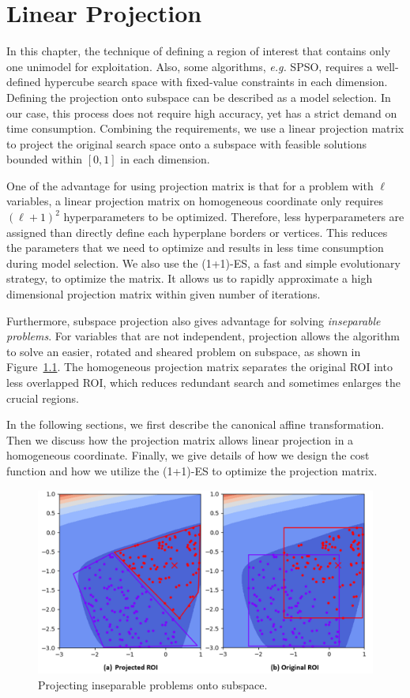 \chapter{Linear Projection}
\label{chapter:projection} 

In this chapter, the technique of defining a region of interest that contains only one unimodel for exploitation.
Also, some algorithms, \textit{e.g.} SPSO, requires a well-defined hypercube search space with fixed-value constraints in each dimension.
Defining the projection onto subspace can be described as a model selection.
In our case, this process does not require high accuracy, yet has a strict demand on time consumption.
Combining the requirements, we use a linear projection matrix to project the original search space 
onto a subspace with feasible solutions bounded within $[0,1]$ in each dimension.

One of the advantage for using projection matrix is that for a problem with $\ell$ variables, 
a linear projection matrix on homogeneous coordinate only requires $(\ell+1)^2$ hyperparameters to be optimized.
Therefore, less hyperparameters are assigned than directly define each hyperplane borders or vertices.  
This reduces the parameters that we need to optimize and results in less time consumption during model selection.
We also use the (1+1)-ES, a fast and simple evolutionary strategy, to optimize the matrix.
It allows us to rapidly approximate a high dimensional projection matrix within given number of iterations.

Furthermore, subspace projection also gives advantage for solving \textit{inseparable problems}.
For variables that are not independent, projection allows the algorithm
to solve an easier, rotated and sheared problem on subspace, as shown in Figure~\ref{fig:Projected_ROI}.
The homogeneous projection matrix separates the original ROI into less overlapped ROI, 
which reduces redundant search and sometimes enlarges the crucial regions.

In the following sections, we first describe the canonical affine transformation.
Then we discuss how the projection matrix allows linear projection in a homogeneous coordinate.
Finally, we give details of how we design the cost function and how we utilize the (1+1)-ES to optimize the projection matrix.

\begin{figure}
\centering
\includegraphics[width=\textwidth]{Projected_ROI}
\caption{Projecting inseparable problems onto subspace.}\label{fig:Projected_ROI}
\end{figure}

